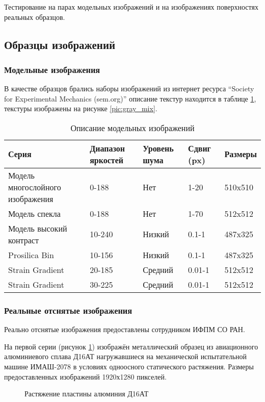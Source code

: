Тестирование  на парах модельных изображений и на изображениях поверхностях реальных образцов.
\subsection{Образцы изображений}
\subsubsection{Модельные изображения}

В качестве образцов брались наборы изображений из интернет ресурса ``Society for Experimental Mechanics (sem.org)'' описание текстур находится в таблице \ref{tab:set_image}, текстуры изображены на рисунке \ref{pic:gray_mix}.

\begin{longtable}[h!]{|m{}|m{}|m{}|m{}|m{}|}
\caption{Описание модельных изображений}
\label{tab:set_image}
\\ \hline
Серия & Диапазон яркостей 	& Уровень шума & Сдвиг (px) &  Размеры \\ \hline
Модель многослойного изображения & 0-188 & Нет & 1-20 &  510x510 \\ \hline
Модель спекла & 0-188 & Нет & 1-70 &  512x512 \\ \hline
Модель высокий контраст & 10-240 & Низкий  & 0.1-1 & 487x325 \\ \hline
Prosilica Bin  & 10-156 & Низкий  & 0.1-1 & 487x325 \\ \hline
Strain Gradient & 20-185 	& Средний  & 0.01-1 & 512x512 \\ \hline
Strain Gradient & 30-225 	& Средний  & 0.01-1 & 512x512 \\ \hline
\end{longtable}

\subsubsection{Реальные отснятые изображения}

Реально отснятые изображения предоставлены сотрудником ИФПМ СО РАН. 

На первой серии (рисунок \ref{pic:al_deform}) изображён металлический образец из авиационного алюминиевого сплава Д16АТ нагружавшиеся на механической испытательной машине ИМАШ-2078 в условиях одноосного статического растяжения. Размеры предоставленных изображений 1920х1280 пикселей.
\begin{figure}[ht]
\caption{Растяжение пластины алюминия Д16АТ}
\label{pic:al_deform}
\end{figure}

